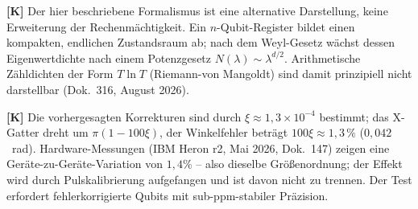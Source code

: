 \textbf{[K]} Der hier beschriebene Formalismus ist eine alternative
Darstellung, keine Erweiterung der Rechenmächtigkeit. Ein $n$-Qubit-Register
bildet einen kompakten, endlichen Zustandsraum ab; nach dem Weyl-Gesetz wächst
dessen Eigenwertdichte nach einem Potenzgesetz $N(\lambda) \sim \lambda^{d/2}$.
Arithmetische Zähldichten der Form $T \ln T$ (Riemann-von Mangoldt) sind damit
prinzipiell nicht darstellbar (Dok.~316, August 2026).

\textbf{[K]} Die vorhergesagten Korrekturen sind durch $\xi \approx 1{,}3 \times 10^{-4}$ bestimmt;
das X-Gatter dreht um $\pi(1-100\xi)$, der Winkelfehler beträgt $100\xi \approx 1{,}3\,\%$ ($0{,}042$~rad).
Hardware-Messungen (IBM Heron r2, Mai 2026, Dok.~147) zeigen eine
Geräte-zu-Geräte-Variation von $1{,}4\%$ -- also dieselbe Größenordnung; der
Effekt wird durch Pulskalibrierung aufgefangen und ist davon nicht zu trennen.
Der Test erfordert fehlerkorrigierte Qubits mit
sub-ppm-stabiler Präzision.
